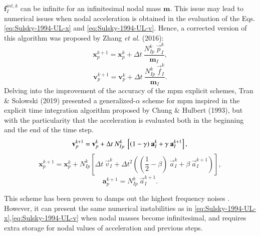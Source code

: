 \documentclass[preprint,12pt,a4paper]{elsarticle}
\newcommand{\vect}[1]{
  \ensuremath{\mathbf{{#1}}}
}
\newcommand{\tens}[1]{
  \ensuremath{\mathbf{{#1}}}
}
\begin{document}
$\vect{f}_I^{int,k}$ can be infinite for an infinitesimal nodal mass
$\tens{m}$. This issue may lead to numerical issues when nodal acceleration
is obtained in the evaluation of the Eqs. \eqref{eq:Sulsky-1994-UL-x} and \eqref{eq:Sulsky-1994-UL-v}. Hence, a
corrected version of this algorithm was proposed by Zhang {\it et al.}
(2016)\cite{Zhang_book_2016}:
\begin{equation}
  \label{eq:Zhang-2016-UL-x}
  \vect{x}_p^{k+1} = \vect{x}_p^{k} + \Delta t\ \frac{N_{Ip}^{k}\ \vec{p}_{I}^{k}}{\tens{m}_I}, 
\end{equation}
\begin{equation}
  \label{eq:Zhang-2016-UL-v}
  \vect{v}_p^{k+1} = \vect{v}_p^{k} + \Delta t\ \frac{N_{Ip}^{k}\ \vec{f}_{I}^{k}}{\tens{m}_I}.
\end{equation}
Delving into the improvement of the accuracy of the \acrshort{mpm} explicit schemes, Tran \& Solowski (2019)\cite{Tran2019e} presented a
generalized-$\alpha$ scheme for \acrshort{mpm} inspired in the explicit time
integration algorithm proposed by Chung \& Hulbert
(1993)\cite{Geranlized_alpha_1993}, but with the particularity that
the acceleration is evaluated both in the beginning and the end of the
time step.
\begin{equation}
  \label{eq:Tran-2019-GA-v}
  \vect{v}_p^{k+1} = \vect{v}_p^{k} + \Delta t\  N_{Ip}^{k}\ \left[(1 - \gamma)\ \vect{a}_I^{k} +
    \gamma\ \vect{a}_I^{k+1} \right],\\
\end{equation}
\begin{equation}
\label{eq:Tran-2019-GA-x}
  \vect{x}_p^{k+1} = \vect{x}_p^{k} + N_{Ip}^{k} \left[ \Delta t\ \vec{v}_{I}^{k}+ \Delta t^2\left( (\frac{1}{2} - \beta)\
    \vec{a}_{I}^{k} + \beta\ \vec{a}_{I}^{k+1} \right) \right],
\end{equation}
\begin{equation}
  \label{eq:Tran-2019-GA-a}
  \vect{a}_p^{k+1} = N_{Ip}^{k}\ \vec{a}_{I}^{k+1}.
\end{equation}

This scheme has been proven to damps out the highest frequency noises
\cite{Tran2019e}. However, it can present the same numerical instabilities
as in \eqref{eq:Sulsky-1994-UL-x},\eqref{eq:Sulsky-1994-UL-v} when
nodal masses become infinitesimal, and requires extra storage for
nodal values of acceleration and previous steps.
\end{document}

